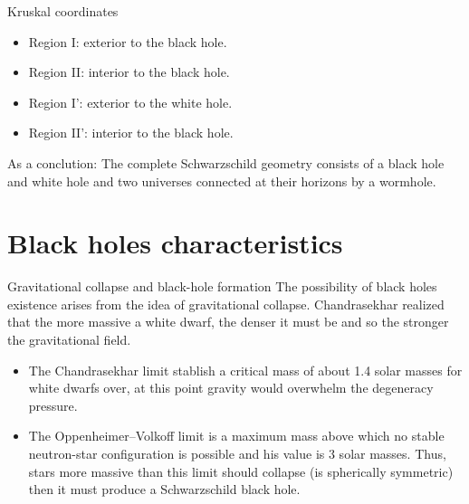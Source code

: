 \documentclass[xcolor=dvipsnames]{beamer}
\begin{document}
\begin{frame}{Kruskal coordinates}
\begin{itemize}
    \item Region I: exterior to the black hole.
    \item Region II: interior to the black hole.
    \item Region I': exterior to the white hole.
    \item Region II': interior to the black hole.\\
\end{itemize}
As a conclution: The complete Schwarzschild geometry consists of a black hole and white hole and two universes connected at their horizons by a
wormhole.
\end{frame}

\section{Black holes characteristics}

\begin{frame}{Gravitational collapse and black-hole formation}
The possibility of black holes existence arises from the idea of gravitational collapse. Chandrasekhar realized that the more massive a white dwarf, the denser it must be and so the stronger the gravitational field. \begin{itemize}
    \item The Chandrasekhar limit stablish a
critical mass of about 1.4 solar masses for white dwarfs over, at this point gravity would
overwhelm the degeneracy pressure.
\item The Oppenheimer–Volkoff limit is a maximum mass above which no stable neutron-star configuration is possible and his value is $3$ solar masses. Thus, stars more massive than this limit should collapse (is spherically symmetric) then it must produce a Schwarzschild black hole.
\end{itemize}
\end{frame}
\end{document}

